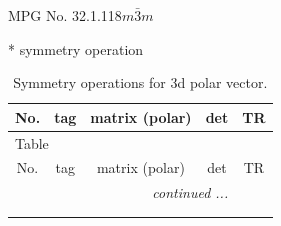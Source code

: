 \documentclass[fleqn,8pt]{jsarticle}
\begin{document}
\setcounter{MaxMatrixCols}{32}

\renewcommand{\tablename}{Table~}
\renewcommand{\figurename}{Figure~}
\begin{center}
\LARGE
MPG No. 32.1.118\quad$m\bar{3}m$
\end{center}
* symmetry operation
\renewcommand{\arraystretch}{1.3}
\begin{longtable}{ccccc}
\caption{Symmetry operations for 3d polar vector.}
 \\
 \hline \hline
No. & tag & matrix (polar) & det & TR \\ \hline \endfirsthead

\multicolumn{4}{l}{\tablename\ \thetable{}} \\
 \hline \hline
No. & tag & matrix (polar) & det & TR \\ \hline \endhead

 \hline \hline
\multicolumn{4}{r}{\footnotesize\it continued ...} \\ \endfoot

 \hline \hline
\multicolumn{4}{r}{} \\ \endlastfoot


\end{longtable}
\end{document}
